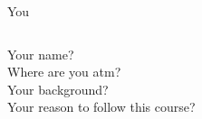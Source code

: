 \documentclass[handout]{beamer}
\begin{document}
\begin{frame}{You}
	\begin{columns}
		Your name?\\
		Where are you atm? \\
		Your background?\\
		Your reason to follow this course?
	\end{columns}
\end{frame}
\end{document}
